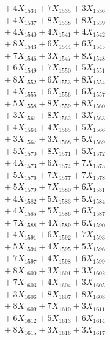 \documentclass[a4paper,10pt]{article}
\begin{document}
{\begin{align}
&\;  + 4 X_{1534} + 7 X_{1535} + 3 X_{1536} \\[0.3ex]
&\;  + 4 X_{1537} + 8 X_{1538} + 8 X_{1539} \\[0.5ex]\allowbreak
&\;  + 4 X_{1540} + 4 X_{1541} + 4 X_{1542} \\[0.3ex]
&\;  + 8 X_{1543} + 6 X_{1544} + 6 X_{1545} \\[0.3ex]
&\;  + 7 X_{1546} + 3 X_{1547} + 8 X_{1548} \\[0.3ex]
&\;  + 6 X_{1549} + 7 X_{1550} + 5 X_{1551} \\[0.3ex]
&\;  + 8 X_{1552} + 6 X_{1553} + 8 X_{1554} \\[0.3ex]
&\;  + 4 X_{1555} + 6 X_{1556} + 6 X_{1557} \\[0.3ex]
&\;  + 5 X_{1558} + 8 X_{1559} + 8 X_{1560} \\[0.3ex]
&\;  + 3 X_{1561} + 8 X_{1562} + 3 X_{1563} \\[0.3ex]
&\;  + 4 X_{1564} + 4 X_{1565} + 5 X_{1566} \\[0.3ex]
&\;  + 3 X_{1567} + 3 X_{1568} + 5 X_{1569} \\[0.5ex]\allowbreak
&\;  + 5 X_{1570} + 8 X_{1571} + 5 X_{1572} \\[0.3ex]
&\;  + 4 X_{1573} + 6 X_{1574} + 7 X_{1575} \\[0.3ex]
&\;  + 5 X_{1576} + 7 X_{1577} + 7 X_{1578} \\[0.3ex]
&\;  + 5 X_{1579} + 7 X_{1580} + 6 X_{1581} \\[0.3ex]
&\;  + 4 X_{1582} + 5 X_{1583} + 5 X_{1584} \\[0.3ex]
&\;  + 4 X_{1585} + 5 X_{1586} + 6 X_{1587} \\[0.3ex]
&\;  + 7 X_{1588} + 4 X_{1589} + 6 X_{1590} \\[0.3ex]
&\;  + 4 X_{1591} + 6 X_{1592} + 7 X_{1593} \\[0.3ex]
&\;  + 5 X_{1594} + 4 X_{1595} + 5 X_{1596} \\[0.3ex]
&\;  + 7 X_{1597} + 4 X_{1598} + 6 X_{1599} \\[0.5ex]\allowbreak
&\;  + 8 X_{1600} + 3 X_{1601} + 3 X_{1602} \\[0.3ex]
&\;  + 7 X_{1603} + 4 X_{1604} + 3 X_{1605} \\[0.3ex]
&\;  + 3 X_{1606} + 8 X_{1607} + 8 X_{1608} \\[0.3ex]
&\;  + 8 X_{1609} + 7 X_{1610} + 3 X_{1611} \\[0.3ex]
&\;  + 6 X_{1612} + 5 X_{1613} + 6 X_{1614} \\[0.3ex]
&\;  + 8 X_{1615} + 3 X_{1616} + 3 X_{1617} \\[0.3ex]

\end{align}}
\end{document}
